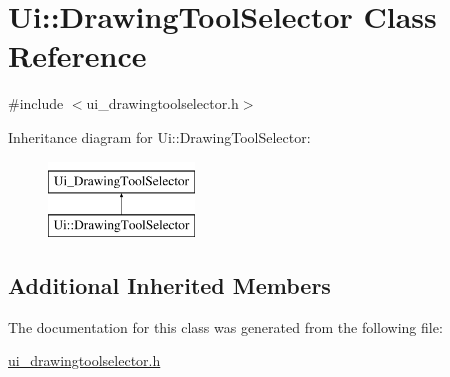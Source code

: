 \hypertarget{class_ui_1_1_drawing_tool_selector}{}\section{Ui\+:\+:Drawing\+Tool\+Selector Class Reference}
\label{class_ui_1_1_drawing_tool_selector}


{\ttfamily \#include $<$ui\+\_\+drawingtoolselector.\+h$>$}

Inheritance diagram for Ui\+:\+:Drawing\+Tool\+Selector\+:\begin{figure}[H]
\begin{center}
\leavevmode
\includegraphics[height=2.000000cm]{class_ui_1_1_drawing_tool_selector}
\end{center}
\end{figure}
\subsection*{Additional Inherited Members}


The documentation for this class was generated from the following file\+:\begin{DoxyCompactItemize}
\item 
\hyperlink{ui__drawingtoolselector_8h}{ui\+\_\+drawingtoolselector.\+h}\end{DoxyCompactItemize}
